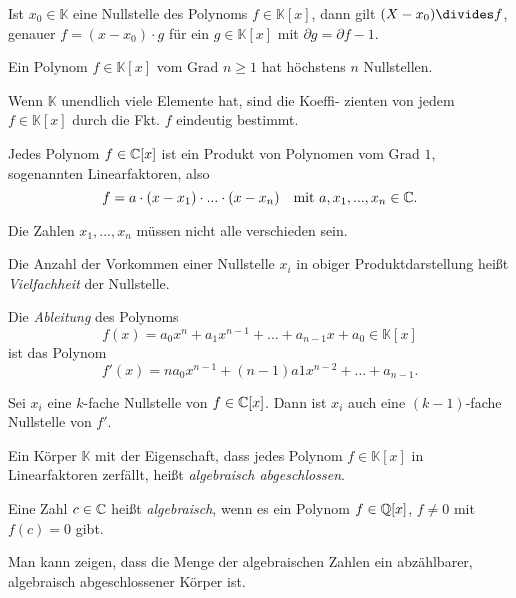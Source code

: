 \documentclass{cheat-sheet}
\newcommand{\K}{\mathbb{K}} %
\begin{document}
\begin{satz}
  Ist $x_0 \in \K$ eine Nullstelle des Polynoms $f \in \K[x]$, dann gilt $(X - x_0) \divides f$, genauer $f = (x{-}x_0) \cdot g$ für ein $g {\in} \K[x]$ mit $\partial g = \partial f {-} 1$.
\end{satz}

\begin{kor}
  Ein Polynom $f \in \K[x]$ vom Grad $n \geq 1$ hat höchstens $n$ Nullstellen.
\end{kor}

\begin{kor}
  Wenn $\K$ unendlich viele Elemente hat, sind die Koeffi- zienten von jedem $f \in \K[x]$ durch die Fkt. $f$ eindeutig bestimmt.
\end{kor}

\begin{satz}
  Jedes Polynom $f \in \mathbb{C}[x]$ ist ein Produkt von Polynomen vom Grad $1$, sogenannten Linearfaktoren, also
  \[
    f = a \cdot (x - x_1) \cdot ... \cdot (x - x_n)
    \quad \text{mit $a, x_1, ..., x_n \in \mathbb{C}$}.
  \]
\end{satz}

\begin{bem}
  Die Zahlen $x_1, ..., x_n$ müssen nicht alle verschieden sein.
\end{bem}

\begin{defn}
  Die Anzahl der Vorkommen einer Nullstelle $x_i$ in obiger Produktdarstellung heißt \emph{Vielfachheit} der Nullstelle.
\end{defn}

\begin{defn}
  Die \emph{Ableitung} des Polynoms
  \[ f(x) = a_0 x^n + a_1 x^{n-1} + ... + a_{n-1} x + a_0 \in \K[x] \]
  ist das Polynom
  \[ f'(x) = n a_0 x^{n-1} + (n{-}1) a1 x^{n-2} + ... + a_{n-1}. \]
\end{defn}

\begin{bem}
  Sei $x_i$ eine $k$-fache Nullstelle von $f \in \mathbb{C}[x]$. Dann ist $x_i$ auch eine $(k{-}1)$-fache Nullstelle von $f'$.
\end{bem}

\begin{defn}
  Ein Körper $\K$ mit der Eigenschaft, dass jedes Polynom $f \in \K[x]$ in Linearfaktoren zerfällt, heißt \emph{algebraisch abgeschlossen}.
\end{defn}

\begin{defn}
  Eine Zahl $c \in \mathbb{C}$ heißt \emph{algebraisch}, wenn es ein Polynom $f \in \mathbb{Q}[x]$, $f \not= 0$ mit $f(c) = 0$ gibt.
\end{defn}

\begin{bem}
  Man kann zeigen, dass die Menge der algebraischen Zahlen ein abzählbarer, algebraisch abgeschlossener Körper ist.
\end{bem}
\end{document}
